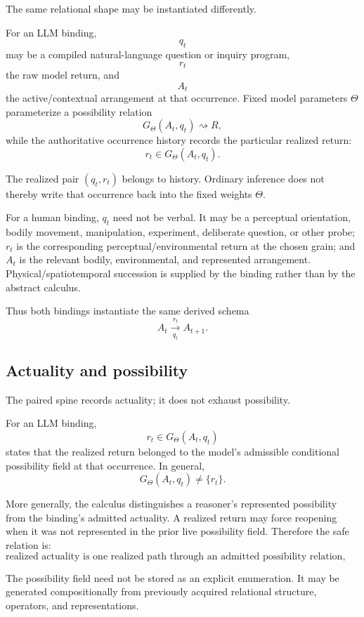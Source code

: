 The same relational shape may be instantiated differently.

For an LLM binding,
\[
q_t
\]
may be a compiled natural-language question or inquiry program,
\[
r_t
\]
the raw model return, and
\[
A_t
\]
the active/contextual arrangement at that occurrence.  Fixed model parameters
\(\Theta\) parameterize a possibility relation
\[
G_\Theta(A_t,q_t)\rightsquigarrow R,
\]
while the authoritative occurrence history records the particular realized
return:
\[
r_t\in G_\Theta(A_t,q_t).
\]

The realized pair \((q_t,r_t)\) belongs to history.  Ordinary inference does
not thereby write that occurrence back into the fixed weights \(\Theta\).

For a human binding, \(q_t\) need not be verbal.  It may be a perceptual
orientation, bodily movement, manipulation, experiment, deliberate question,
or other probe; \(r_t\) is the corresponding perceptual/environmental return
at the chosen grain; and \(A_t\) is the relevant bodily, environmental, and
represented arrangement.  Physical/spatiotemporal succession is supplied by
the binding rather than by the abstract calculus.

Thus both bindings instantiate the same derived schema
\[
\boxed{
A_t\xrightarrow[q_t]{r_t}A_{t+1}.
}
\]

\subsection{Actuality and possibility}

The paired spine records actuality; it does not exhaust possibility.

For an LLM binding,
\[
r_t\in G_\Theta(A_t,q_t)
\]
states that the realized return belonged to the model's admissible conditional
possibility field at that occurrence.  In general,
\[
G_\Theta(A_t,q_t)\neq\{r_t\}.
\]

More generally, the calculus distinguishes a reasoner's represented
possibility from the binding's admitted actuality.  A realized return may
force reopening when it was not represented in the prior live possibility
field.  Therefore the safe relation is:
\[
\boxed{
\text{realized actuality is one realized path through an admitted possibility
relation, while the reasoner's prior represented possibility may be
incomplete.}
}
\]

The possibility field need not be stored as an explicit enumeration.  It may
be generated compositionally from previously acquired relational structure,
operators, and representations.

